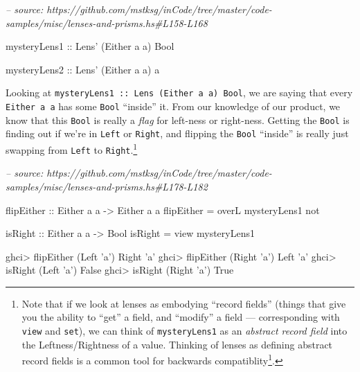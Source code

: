 \documentclass[]{article}
\newenvironment{Shaded}{}{}
\newcommand{\CharTok}[1]{\textcolor[rgb]{0.25,0.44,0.63}{#1}}
\newcommand{\CommentTok}[1]{\textcolor[rgb]{0.38,0.63,0.69}{\textit{#1}}}
\newcommand{\DataTypeTok}[1]{\textcolor[rgb]{0.56,0.13,0.00}{#1}}
\newcommand{\FunctionTok}[1]{\textcolor[rgb]{0.02,0.16,0.49}{#1}}
\newcommand{\NormalTok}[1]{#1}
\newcommand{\OtherTok}[1]{\textcolor[rgb]{0.00,0.44,0.13}{#1}}
\renewcommand{\href}[2]{#2\footnote{\url{#1}}}
\begin{document}
\begin{Shaded}
\begin{Highlighting}[]
\CommentTok{-- source: https://github.com/mstksg/inCode/tree/master/code-samples/misc/lenses-and-prisms.hs#L158-L168}

\OtherTok{mysteryLens1 ::} \DataTypeTok{Lens'}\NormalTok{ (}\DataTypeTok{Either}\NormalTok{ a a) }\DataTypeTok{Bool}

\OtherTok{mysteryLens2 ::} \DataTypeTok{Lens'}\NormalTok{ (}\DataTypeTok{Either}\NormalTok{ a a) a}
\end{Highlighting}
\end{Shaded}

Looking at
\texttt{mysteryLens1\ ::\ Lens\textquotesingle{}\ (Either\ a\ a)\ Bool}, we are
saying that every \texttt{Either\ a\ a} has some \texttt{Bool} ``inside'' it.
From our knowledge of our product, we know that this \texttt{Bool} is really a
\emph{flag} for left-ness or right-ness. Getting the \texttt{Bool} is finding
out if we're in \texttt{Left} or \texttt{Right}, and flipping the \texttt{Bool}
``inside'' is really just swapping from \texttt{Left} to
\texttt{Right}.\footnote{Note that if we look at lenses as embodying ``record
  fields'' (things that give you the ability to ``get'' a field, and ``modify''
  a field --- corresponding with \texttt{view} and \texttt{set}), we can think
  of \texttt{mysteryLens1} as an \emph{abstract record field} into the
  Leftness/Rightness of a value. Thinking of lenses as defining abstract record
  fields is a
  \href{http://blog.ezyang.com/2016/12/a-tale-of-backwards-compatibility-in-asts/}{common
  tool for backwards compatiblity}.}

\begin{Shaded}
\begin{Highlighting}[]
\CommentTok{-- source: https://github.com/mstksg/inCode/tree/master/code-samples/misc/lenses-and-prisms.hs#L178-L182}

\OtherTok{flipEither ::} \DataTypeTok{Either}\NormalTok{ a a }\OtherTok{->} \DataTypeTok{Either}\NormalTok{ a a}
\NormalTok{flipEither }\FunctionTok{=}\NormalTok{ overL mysteryLens1 not}

\OtherTok{isRight ::} \DataTypeTok{Either}\NormalTok{ a a }\OtherTok{->} \DataTypeTok{Bool}
\NormalTok{isRight }\FunctionTok{=}\NormalTok{ view mysteryLens1}
\end{Highlighting}
\end{Shaded}

\begin{Shaded}
\begin{Highlighting}[]
\NormalTok{ghci}\FunctionTok{>}\NormalTok{ flipEither (}\DataTypeTok{Left} \CharTok{'a'}\NormalTok{)}
\DataTypeTok{Right} \CharTok{'a'}
\NormalTok{ghci}\FunctionTok{>}\NormalTok{ flipEither (}\DataTypeTok{Right} \CharTok{'a'}\NormalTok{)}
\DataTypeTok{Left} \CharTok{'a'}
\NormalTok{ghci}\FunctionTok{>}\NormalTok{ isRight (}\DataTypeTok{Left} \CharTok{'a'}\NormalTok{)}
\DataTypeTok{False}
\NormalTok{ghci}\FunctionTok{>}\NormalTok{ isRight (}\DataTypeTok{Right} \CharTok{'a'}\NormalTok{)}
\DataTypeTok{True}
\end{Highlighting}
\end{Shaded}
\end{document}
